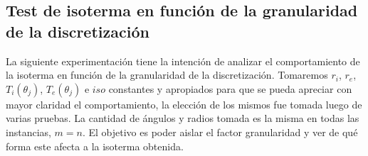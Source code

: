 \subsection{Test de isoterma en función de la granularidad de la discretización}
La siguiente experimentación tiene la intención de analizar el comportamiento de la isoterma en función de la granularidad de la discretización.
Tomaremos $r_i$, $r_e$, $T_i(\theta_j)$, $T_e(\theta_j)$ e $iso$ constantes y apropiados para que se pueda apreciar con mayor claridad el comportamiento, la elección de los mismos fue tomada luego de varias pruebas.
La cantidad de ángulos y radios tomada es la misma en todas las instancias, $m = n$. El objetivo es poder aislar el factor granularidad y ver de qué forma este afecta a la isoterma obtenida.